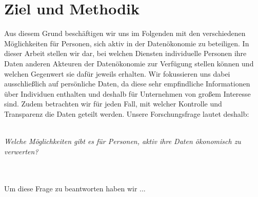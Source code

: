 \section{Ziel und Methodik}

Aus diesem Grund beschäftigen wir uns im Folgenden mit den verschiedenen Möglichkeiten für Personen, sich aktiv in der Datenökonomie zu beteiligen. In dieser Arbeit stellen wir dar, bei welchen Diensten individuelle Personen ihre Daten anderen Akteuren der Datenökonomie zur Verfügung stellen können und welchen Gegenwert sie dafür jeweils erhalten. Wir fokussieren uns dabei ausschließlich auf persönliche Daten, da diese sehr empfindliche Informationen über Individuen enthalten und deshalb für Unternehmen von großem Interesse sind. Zudem betrachten wir für jeden Fall, mit welcher Kontrolle und Transparenz die Daten geteilt werden. Unsere Forschungsfrage lautet deshalb:
\\
\\
\centerline{\textit{Welche Möglichkeiten gibt es für Personen, aktiv ihre Daten ökonomisch zu verwerten?}}
\\
\\
Um diese Frage zu beantworten haben wir ...